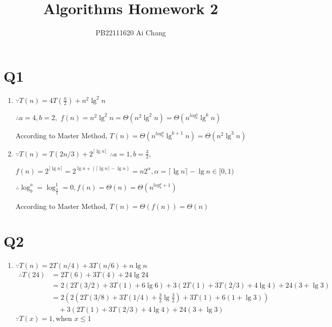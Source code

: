 \documentclass{article}
\title{Algorithms Homework 2}
\author{PB22111620  Ai Chang}
\begin{document}
\begin{sloppypar}

\maketitle

\section*{Q1}
\begin{enumerate}
    \item $\because T(n) = 4T(\frac{n}{2}) + n^2 \lg^2 n$

    $\therefore a = 4, b = 2,$
    $f(n) = n^2 \lg^2 n = \Theta(n^2 \lg^2 n) = \Theta(n^{log_b^a}\lg^kn)$

    According to Master Method, $T(n) = \Theta(n^{log_b^a}\lg^{k+1}n) = \Theta(n^2\lg^3n)$

    \item $\because T(n) = T(2n/3) + 2^{\lceil \lg n \rceil}$
    $\therefore a = 1, b = \frac{3}{2},$

    $f(n) = 2^{\lceil \lg n \rceil} = 2^{\lg n + (\lceil \lg n \rceil - \lg n)} = n2^\alpha, \alpha = \lceil \lg n \rceil - \lg n \in [0, 1)$

    $\therefore \log_b^a = \log_{\frac{3}{2}}^{1} = 0, f(n) = \Theta(n) = \Theta(n^{log_b^a + 1})$

    According to Master Method, $T(n) = \Theta(f(n)) = \Theta(n)$
\end{enumerate}

\section*{Q2}
\begin{enumerate}
    \item $\because T(n) = 2T(n/4) + 3T(n/6) + n\lg n$
    \begin{align*} \therefore
        T(24)   &= 2T(6) + 3T(4) + 24\lg 24\\
                &= 2(2T(3/2) + 3T(1) + 6\lg 6) + 3(2T(1) + 3T(2/3) + 4\lg 4) + 24(3 + \lg 3)\\
                &= 2(2(2T(3/8) + 3T(1/4) + \frac{3}{2}\lg{\frac{3}{2}}) + 3T(1) + 6(1 + \lg 3))\\
                &\quad + 3(2T(1) + 3T(2/3) + 4\lg 4) + 24(3 + \lg 3)
    \end{align*}
    $\because T(x) = 1, \text{when } x \leq 1$


\end{enumerate}
\end{sloppypar}
\end{document}
